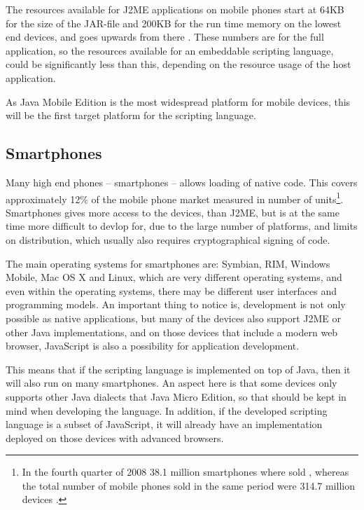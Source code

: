 \documentclass[11pt]{report}
\begin{document}
The resources available for J2ME applications on mobile phones start at 64KB for the size of the JAR-file and 200KB for the run time memory on the lowest end devices, and goes upwards from there \cite{nokia-optim}.
These numbers are for the full application, so the resources available for an embeddable scripting language, could be significantly less than this, depending on the resource usage of the host application.

As Java Mobile Edition is the most widespread platform for mobile devices, this will be the first target platform for the scripting language.

\subsection{Smartphones}
Many high end phones -- smartphones --  allows loading of native code. 
This covers approximately 12\% of the mobile phone market measured in number of units\footnote{In the fourth quarter of 2008 38.1 million smartphones where sold \cite{gartner}, whereas the total number of mobile phones sold in the same period were 314.7 million devices \cite{cellular-news}.}.
Smartphones gives more access to the devices, than J2ME, but is at the same time more difficult to devlop for, due to the large number of platforms, and limits on distribution, which usually also requires cryptographical signing of code.

The main operating systems for smartphones are: Symbian, RIM, Windows Mobile, Mac OS X and Linux, which are very different operating systems, and even within the operating systems, there may be different user interfaces and programming models.
An important thing to notice is, development is not only possible as native applications, but many of the devices also support J2ME or other Java implementations, and on those devices that include a modern web browser, JavaScript is also a possibility for application development.

This means that if the scripting language is implemented on top of Java, then it will also run on many smartphones.  An aspect here is that some devices only supports other Java dialects that Java Micro Edition, so that should be kept in mind when developing the language. In addition, if the developed scripting language is a subset of JavaScript, it will already have an implementation deployed on those devices with advanced browsers.
\end{document}
